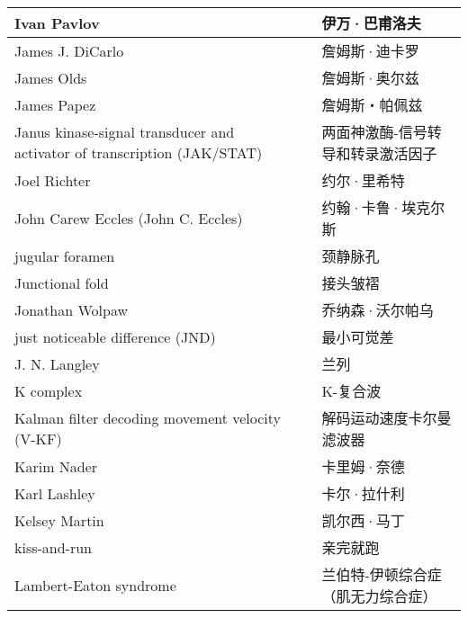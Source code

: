 \begin{longtable}{lll}
	\midrule
	Ivan Pavlov   && 伊万·巴甫洛夫  \\
	
	\midrule
	James J. DiCarlo   && 詹姆斯·迪卡罗  \\
	
	\midrule
	James Olds   && 詹姆斯·奥尔兹  \\
	
	\midrule
	James Papez   && 詹姆斯‧帕佩兹  \\
	
	\midrule
	Janus kinase-signal transducer and activator of transcription (JAK/STAT)  && 两面神激酶-信号转导和转录激活因子  \\
	
	\midrule
	Joel Richter   && 约尔·里希特  \\
	
	\midrule
	John Carew Eccles (John C. Eccles)   && 约翰·卡鲁·埃克尔斯  \\
	
	\midrule
	jugular foramen   && 颈静脉孔  \\
	
	\midrule
	Junctional fold   && 接头皱褶  \\
	
	\midrule
	Jonathan Wolpaw   && 乔纳森·沃尔帕乌  \\
	
	\midrule
	just noticeable difference (JND)   && 最小可觉差  \\
	
	\midrule
	J. N. Langley   && 兰列  \\
	
	\midrule
	K complex   && K-复合波  \\
	
	\midrule
	Kalman filter decoding movement velocity (V-KF)   && 解码运动速度卡尔曼滤波器  \\
	
	\midrule
	Karim Nader   && 卡里姆·奈德  \\
	
	\midrule
	Karl Lashley  && 卡尔·拉什利  \\
	
	\midrule
	Kelsey Martin   && 凯尔西·马丁  \\
	
	\midrule
	kiss-and-run   && 亲完就跑  \\
	
	\midrule
	Lambert-Eaton syndrome   && 兰伯特-伊顿综合症（肌无力综合症）  \\
	

\end{longtable}
